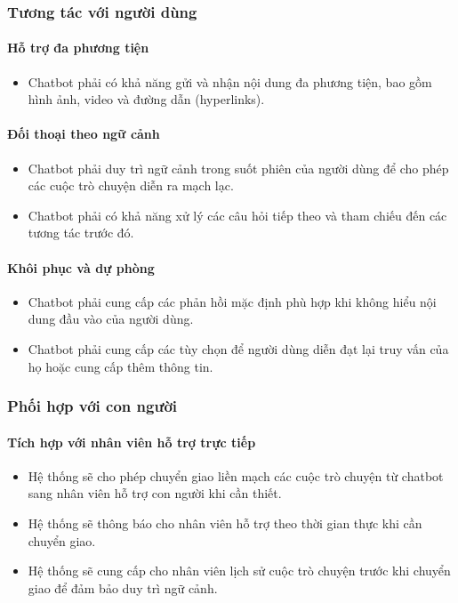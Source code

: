 \subsubsection{Tương tác với người dùng}

\paragraph{Hỗ trợ đa phương tiện}
\begin{itemize}
    \item Chatbot phải có khả năng gửi và nhận nội dung đa phương tiện, bao gồm hình ảnh, video và đường dẫn (hyperlinks).
\end{itemize}

\paragraph{Đối thoại theo ngữ cảnh}
\begin{itemize}
    \item Chatbot phải duy trì ngữ cảnh trong suốt phiên của người dùng để cho phép các cuộc trò chuyện diễn ra mạch lạc.
    \item Chatbot phải có khả năng xử lý các câu hỏi tiếp theo và tham chiếu đến các tương tác trước đó.
\end{itemize}

\paragraph{Khôi phục và dự phòng}
\begin{itemize}
    \item Chatbot phải cung cấp các phản hồi mặc định phù hợp khi không hiểu nội dung đầu vào của người dùng.
    \item Chatbot phải cung cấp các tùy chọn để người dùng diễn đạt lại truy vấn của họ hoặc cung cấp thêm thông tin.
\end{itemize}

\subsubsection{Phối hợp với con người}

\paragraph{Tích hợp với nhân viên hỗ trợ trực tiếp}
\begin{itemize}
    \item Hệ thống sẽ cho phép chuyển giao liền mạch các cuộc trò chuyện từ chatbot sang nhân viên hỗ trợ con người khi cần thiết.
    \item Hệ thống sẽ thông báo cho nhân viên hỗ trợ theo thời gian thực khi cần chuyển giao.
    \item Hệ thống sẽ cung cấp cho nhân viên lịch sử cuộc trò chuyện trước khi chuyển giao để đảm bảo duy trì ngữ cảnh.
\end{itemize}

